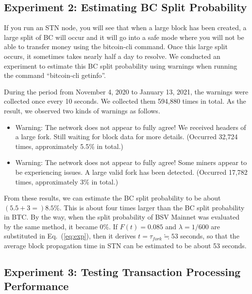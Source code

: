 \documentclass[graybox]{svmult}
\begin{document}
\subsection{Experiment 2: Estimating BC Split Probability}
\label{sec:sork}

If you run an STN node, you will see that when a large block has been created, a large split of BC will occur and it will go into a safe mode where you will not be able to transfer money using the bitcoin-cli command. 
Once this large split occurs, it sometimes takes nearly half a day to resolve.
We conducted an experiment to estimate this BC split probability using warnings when running the command ``bitcoin-cli getinfo''.


During the period from November 4, 2020 to January 13, 2021, the warnings were collected once every 10 seconds. We collected them 594,880 times in total. 
As the result, we observed two kinds of warnings as follows.
%
\begin{itemize}
  \item Warning: The network does not appear to fully agree! We received
        headers of a large fork. Still waiting for block data for more details.
	(Occurred 32,724 times, approximately 5.5\% in total.)

  \item Warning: The network does not appear to fully agree! Some miners
        appear to be experiencing issues. A large valid fork has been detected. 
	(Occurred 17,782 times, approximately 3\% in total.)
\end{itemize}
%
From these results, we can estimate the BC split probability to be about $(5.5 + 3 =) 8.5$\%.
This is about four times larger than the BC split probability in BTC. 
By the way, when the split probability of BSV Mainnet was evaluated by the same method, it became 0\%.
If $F(t) = 0.085$ and $\lambda = 1/600$ are substituted in Eq.~(\ref{eq:exp}), then it derives $t = \tau_{fork} \fallingdotseq 53$ seconds, so that the average block propagation time in STN can be estimated to be about 53 seconds. 



\subsection{Experiment 3: Testing Transaction Processing Performance}
\label{sec:method}
\end{document}

